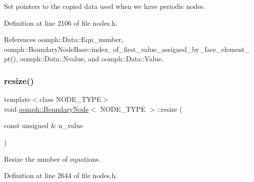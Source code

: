 Set pointers to the copied data used when we have periodic nodes. 



Definition at line 2106 of file nodes.\+h.



References oomph\+::\+Data\+::\+Eqn\+\_\+number, oomph\+::\+Boundary\+Node\+Base\+::index\+\_\+of\+\_\+first\+\_\+value\+\_\+assigned\+\_\+by\+\_\+face\+\_\+element\+\_\+pt(), oomph\+::\+Data\+::\+Nvalue, and oomph\+::\+Data\+::\+Value.

\mbox{\label{classoomph_1_1BoundaryNode_a8ceaf97ad0211572e251091f84e4f607}} 
\subsubsection{\texorpdfstring{resize()}{resize()}}
{\footnotesize\ttfamily template$<$class N\+O\+D\+E\+\_\+\+T\+Y\+PE$>$ \\
void \hyperlink{classoomph_1_1BoundaryNode}{oomph\+::\+Boundary\+Node}$<$ N\+O\+D\+E\+\_\+\+T\+Y\+PE $>$\+::resize (\begin{DoxyParamCaption}\item[{const unsigned \&}]{n\+\_\+value }\end{DoxyParamCaption})\hspace{0.3cm}{\ttfamily [inline]}}



Resize the number of equations. 



Definition at line 2644 of file nodes.\+h.

\mbox{\label{classoomph_1_1BoundaryNode_a3478a8db5e0bb06a7091e53c467f31db}} 
